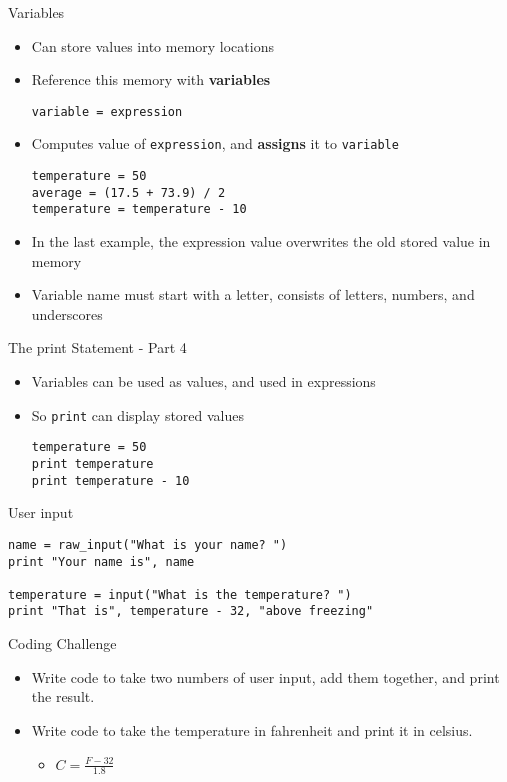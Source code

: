 \begin{frame}[fragile]{Variables}
  \begin{itemize}
    \item Can store values into memory locations
    \item Reference this memory with \textbf{variables}
\begin{lstlisting}
variable = expression
\end{lstlisting}
    \item Computes value of \texttt{expression}, and \textbf{assigns} it to \texttt{variable}
\begin{lstlisting}
temperature = 50
average = (17.5 + 73.9) / 2
temperature = temperature - 10
\end{lstlisting}
\item In the last example, the expression value overwrites the old stored value in memory
\item Variable name must start with a letter, consists of letters, numbers, and underscores
  \end{itemize}
\end{frame}

\begin{frame}[fragile]{The {\ttfamily print} Statement - Part 4}
  \begin{itemize}
    \item Variables can be used as values, and used in expressions
    \item So \texttt{print} can display stored values
\begin{lstlisting}
temperature = 50
print temperature
print temperature - 10
\end{lstlisting}
  \end{itemize}
\end{frame}

\begin{frame}[fragile]{User input}
\begin{lstlisting}
name = raw_input("What is your name? ")
print "Your name is", name

temperature = input("What is the temperature? ")
print "That is", temperature - 32, "above freezing"
\end{lstlisting}
\end{frame}

\begin{frame}{Coding Challenge}
  \begin{itemize}
    \item Write code to take two numbers of user input, add them together, and print the result.
    \item Write code to take the temperature in fahrenheit and print it in celsius.
      \begin{itemize}
        \item $C = \displaystyle\frac{F - 32}{1.8}$
      \end{itemize}
  \end{itemize}
\end{frame}

